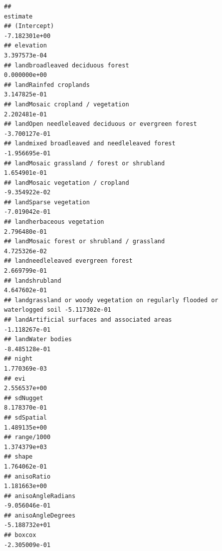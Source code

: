 \documentclass[
]{article}
\begin{document}
\begin{verbatim}
##                                                                                 estimate
## (Intercept)                                                                -7.182301e+00
## elevation                                                                   3.397573e-04
## landbroadleaved deciduous forest                                            0.000000e+00
## landRainfed croplands                                                       3.147825e-01
## landMosaic cropland / vegetation                                            2.202481e-01
## landOpen needleleaved deciduous or evergreen forest                        -3.700127e-01
## landmixed broadleaved and needleleaved forest                              -1.956695e-01
## landMosaic grassland / forest or shrubland                                  1.654901e-01
## landMosaic vegetation / cropland                                           -9.354922e-02
## landSparse vegetation                                                      -7.019042e-01
## landherbaceous vegetation                                                   2.796480e-01
## landMosaic forest or shrubland / grassland                                  4.725326e-02
## landneedleleaved evergreen forest                                           2.669799e-01
## landshrubland                                                               4.647602e-01
## landgrassland or woody vegetation on regularly flooded or waterlogged soil -5.117302e-01
## landArtificial surfaces and associated areas                               -1.118267e-01
## landWater bodies                                                           -8.485128e-01
## night                                                                       1.770369e-03
## evi                                                                         2.556537e+00
## sdNugget                                                                    8.178370e-01
## sdSpatial                                                                   1.489135e+00
## range/1000                                                                  1.374379e+03
## shape                                                                       1.764062e-01
## anisoRatio                                                                  1.181663e+00
## anisoAngleRadians                                                          -9.056046e-01
## anisoAngleDegrees                                                          -5.188732e+01
## boxcox                                                                     -2.305009e-01

\end{verbatim}
\end{document}
